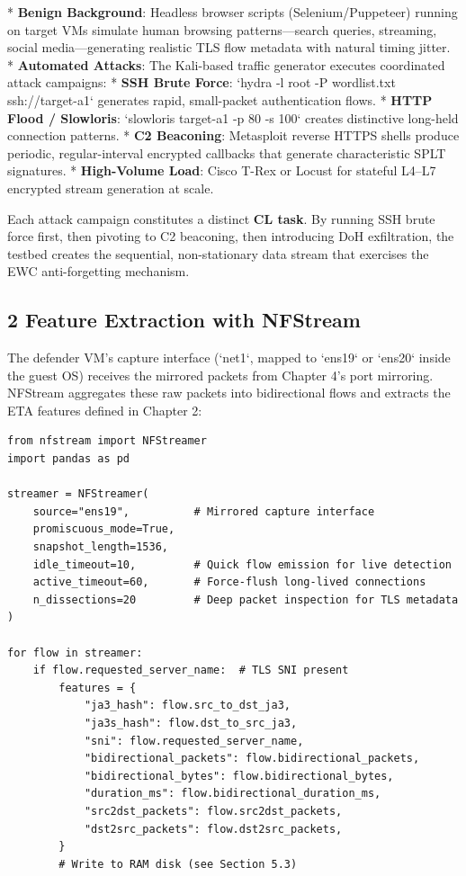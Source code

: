 \documentclass[conference]{IEEEtran}
\begin{document}
* \textbf{Benign Background}: Headless browser scripts (Selenium/Puppeteer) running on target VMs simulate human browsing patterns—search queries, streaming, social media—generating realistic TLS flow metadata with natural timing jitter.
* \textbf{Automated Attacks}: The Kali-based traffic generator executes coordinated attack campaigns:
  * \textbf{SSH Brute Force}: `hydra -l root -P wordlist.txt ssh://target-a1` generates rapid, small-packet authentication flows.
  * \textbf{HTTP Flood / Slowloris}: `slowloris target-a1 -p 80 -s 100` creates distinctive long-held connection patterns.
  * \textbf{C2 Beaconing}: Metasploit reverse HTTPS shells produce periodic, regular-interval encrypted callbacks that generate characteristic SPLT signatures.
* \textbf{High-Volume Load}: Cisco T-Rex or Locust for stateful L4–L7 encrypted stream generation at scale.

Each attack campaign constitutes a distinct \textbf{CL task}. By running SSH brute force first, then pivoting to C2 beaconing, then introducing DoH exfiltration, the testbed creates the sequential, non-stationary data stream that exercises the EWC anti-forgetting mechanism.


\subsection{2 Feature Extraction with NFStream}

The defender VM's capture interface (`net1`, mapped to `ens19` or `ens20` inside the guest OS) receives the mirrored packets from Chapter 4's port mirroring. NFStream aggregates these raw packets into bidirectional flows and extracts the ETA features defined in Chapter 2:

\begin{verbatim}
from nfstream import NFStreamer
import pandas as pd

streamer = NFStreamer(
    source="ens19",          # Mirrored capture interface
    promiscuous_mode=True,
    snapshot_length=1536,
    idle_timeout=10,         # Quick flow emission for live detection
    active_timeout=60,       # Force-flush long-lived connections
    n_dissections=20         # Deep packet inspection for TLS metadata
)

for flow in streamer:
    if flow.requested_server_name:  # TLS SNI present
        features = {
            "ja3_hash": flow.src_to_dst_ja3,
            "ja3s_hash": flow.dst_to_src_ja3,
            "sni": flow.requested_server_name,
            "bidirectional_packets": flow.bidirectional_packets,
            "bidirectional_bytes": flow.bidirectional_bytes,
            "duration_ms": flow.bidirectional_duration_ms,
            "src2dst_packets": flow.src2dst_packets,
            "dst2src_packets": flow.dst2src_packets,
        }
        # Write to RAM disk (see Section 5.3)
\end{verbatim}
\end{document}

